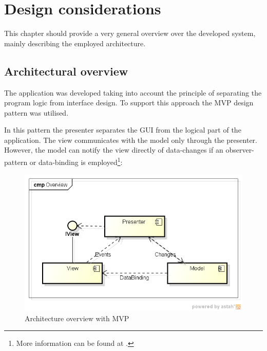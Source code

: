 \chapter{Design considerations}\label{ch:design} %

This chapter should provide a very general overview over the developed system, mainly describing the employed architecture.

\section{Architectural overview}
\label{sec:architectural overview}

The application was developed taking into account the principle of separating the program logic from interface design. To support this approach the \acf{MVP} design pattern was utilised.

In this pattern the presenter separates the \ac{GUI} from the logical part of the application. The view communicates with the model only through the presenter. However, the model can notify the view directly of  data-changes if an observer-pattern or data-binding is employed\footnote{More information can be found at \textcite{Boodhoo2006}.}:

\begin{figure}[H]
\begin{center}
\includegraphics[width=\textwidth]{gfx/architecture_overview.png}
\caption{Architecture overview with \ac{MVP}}
\label{fig:architecture_overview}
\end{center}
\end{figure}

